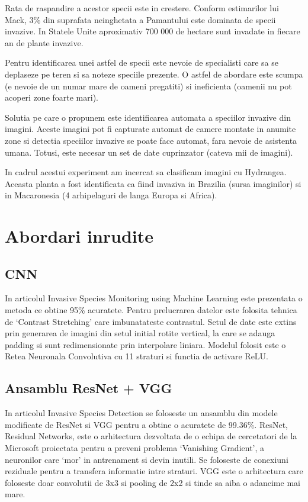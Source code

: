\documentclass{article}
\begin{document}
Rata de raspandire a acestor specii este in crestere. Conform estimarilor lui Mack, 3\% din suprafata neinghetata a Pamantului este dominata de specii invazive\cite{BOOK:3}. In Statele Unite aproximativ 700 000 de hectare sunt invadate in fiecare an de plante invazive\cite{ARTICLE:5}.  

Pentru identificarea unei astfel de specii este nevoie de specialisti care sa se deplaseze pe teren si sa noteze speciile prezente. O astfel de abordare este scumpa (e nevoie de un numar mare de oameni pregatiti) si ineficienta (oamenii nu pot acoperi zone foarte mari).

Solutia pe care o propunem este identificarea automata a speciilor invazive din imagini. Aceste imagini pot fi capturate automat de camere montate in anumite zone si detectia speciilor invazive se poate face automat, fara nevoie de asistenta umana. Totusi, este necesar un set de date cuprinzator (cateva mii de imagini).

In cadrul acestui experiment am incercat sa clasificam imagini cu Hydrangea. Aceasta planta a fost identificata ca fiind invaziva in Brazilia (sursa imaginilor) si in Macaronesia (4 arhipelaguri de langa Europa si Africa)\cite{BOOK:1}.

\section{Abordari inrudite}

\subsection{CNN}
In articolul Invasive Species Monitoring using Machine Learning\cite{WEBSITE:4} este prezentata o metoda ce obtine 95\% acuratete.  Pentru prelucrarea datelor este folosita tehnica de ‘Contrast Stretching’ care imbunatateste contrastul. Setul de date este extins prin generarea de imagini din setul initial rotite vertical, la care se adauga padding si sunt redimensionate prin interpolare liniara. Modelul folosit este o Retea Neuronala Convolutiva cu 11 straturi si functia de activare ReLU.

\subsection{Ansamblu ResNet + VGG}
In articolul Invasive Species Detection\cite{ARTICLE:1} se foloseste un ansamblu din modele modificate de ResNet si VGG pentru a obtine o acuratete de 99.36\%. ResNet, Residual Networks, este o arhitectura dezvoltata de o echipa de cercetatori de la Microsoft proiectata pentru a preveni problema ‘Vanishing Gradient’, a neuronilor care ‘mor’ in antrenament si devin inutili. Se foloseste de conexiuni reziduale pentru a transfera informatie intre straturi\cite{ARTICLE:2}. VGG este o arhitectura care foloseste doar convolutii de 3x3 si pooling de 2x2 si tinde sa aiba o adancime mai mare\cite{ARTICLE:3}.
 
\end{document}
